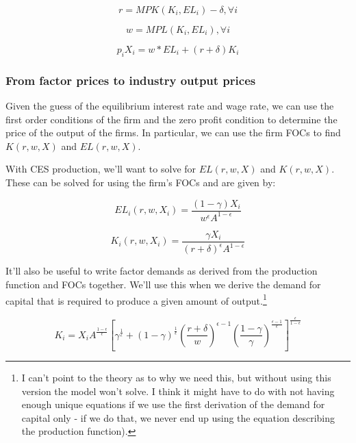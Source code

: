 \documentclass[letterpaper,12pt]{article}
\theoremstyle{definition}
\begin{document}
\begin{spacing}{1.5}
\begin{equation}
r = MPK(K_{i},EL_{i}) - \delta, \forall i
\end{equation}

\begin{equation}
w = MPL(K_{i},EL_{i}), \forall i
\end{equation}

\begin{equation}
p_{i}X_{i}= w*EL_{i} + (r+\delta)K_{i}
\end{equation}
 
 
\subsubsection*{From factor prices to industry output prices}

Given the guess of the equilibrium interest rate and wage rate, we can use the first order conditions of the firm and the zero profit condition to determine the price of the output of the firms.  In particular, we can use the firm FOCs to find $K(r,w,X)$ and $EL(r,w,X)$.  

With CES production, we'll want to solve for $EL(r,w,X)$ and $K(r,w,X)$.  These can be solved for using the firm's FOCs and are given by:

\begin{equation}
\label{eqn:l_demand}
EL_{i}(r,w,X_{i})=\frac{(1-\gamma)X_{i}}{w^{\epsilon}A^{1-\epsilon}}
\end{equation}



\begin{equation}
\label{eqn:k_demand}
K_{i}(r,w,X_{i})=\frac{\gamma X_{i}}{(r+\delta)^{\epsilon}A^{1-\epsilon}}
\end{equation}


It'll also be useful to write factor demands as derived from the production function and FOCs together.  We'll use this when we derive the demand for capital that is required to produce a given amount of output.\footnote{I can't point to the theory as to why we need this, but without using this version the model won't solve.  I think it might have to do with not having enough unique equations if we use the first derivation of the demand for capital only - if we do that, we never end up using the equation describing the production function).} 

\begin{equation}
\label{eqn:k_demand2}
K_{i} = X_{i}A^{\frac{1-\epsilon}{\epsilon}}\left[\gamma^{\frac{1}{\epsilon}}+(1-\gamma)^{\frac{1}{\epsilon}}\left(\frac{r+\delta}{w}\right)^{\epsilon-1}\left(\frac{1-\gamma}{\gamma}\right)^{\frac{\epsilon-1}{\epsilon}}\right]^{\frac{\epsilon}{1-\epsilon}}
\end{equation}


\end{spacing}
\end{document}
